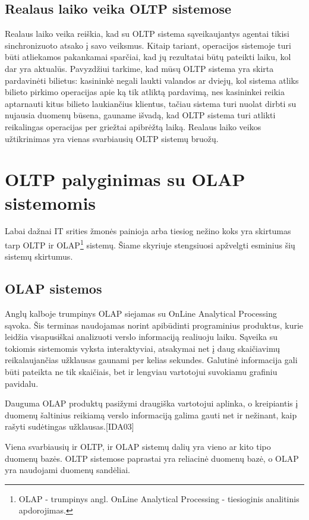 \documentclass[12pt,a4paper,titlepage]{article}
\begin{document}
\subsection{Realaus laiko veika OLTP sistemose}
Realaus laiko veika reiškia, kad su OLTP sistema sąveikaujantys agentai tikisi sinchronizuoto atsako į savo veiksmus. Kitaip tariant, operacijos sistemoje turi būti atliekamos pakankamai sparčiai, kad jų rezultatai būtų pateikti laiku, kol dar yra aktualūs. Pavyzdžiui tarkime, kad mūsų OLTP sistema yra skirta pardavinėti bilietus: kasininkė negali laukti valandos ar dviejų, kol sistema atliks bilieto pirkimo operacijas apie ką tik atliktą pardavimą, nes kasininkei reikia aptarnauti kitus bilieto laukiančius klientus, tačiau sistema turi nuolat dirbti su nujausia duomenų būsena, gauname išvadą, kad OLTP sistema turi atlikti reikalingas operacijas per griežtai apibrėžtą laiką. Realaus laiko veikos užtikrinimas yra vienas svarbiausių OLTP sistemų bruožų.

\section{OLTP palyginimas su OLAP sistemomis}

Labai dažnai IT srities žmonės painioja arba tiesiog nežino koks yra skirtumas tarp OLTP ir OLAP\footnote{OLAP - trumpinys angl. OnLine Analytical Processing - tiesioginis analitinis apdorojimas.} sistemų. Šiame skyriuje stengsiuosi apžvelgti esminius šių sistemų skirtumus.

\subsection{OLAP sistemos}

Anglų kalboje trumpinys OLAP siejamas su OnLine Analytical Processing sąvoka. Šis terminas naudojamas norint apibūdinti programinius produktus, kurie leidžia visapusiškai analizuoti verslo informaciją realiuoju laiku. Sąveika su tokiomis sistemomis vyksta interaktyviai, atsakymai net į daug skaičiavimų reikalaujančias užklausas gaunami per kelias sekundes. Galutinė informacija gali būti pateikta ne tik skaičiais, bet ir lengviau vartotojui suvokiamu grafiniu pavidalu.

Dauguma OLAP produktų pasižymi draugiška vartotojui aplinka, o kreipiantis į duomenų šaltinius reikiamą verslo informaciją galima gauti net ir nežinant, kaip rašyti sudėtingas užklausas.[IDA03]

Viena svarbiausių ir OLTP, ir OLAP sistemų dalių yra vieno ar kito tipo duomenų bazės. OLTP sistemose paprastai yra reliacinė duomenų bazė, o OLAP yra naudojami duomenų sandėliai.
\end{document}
